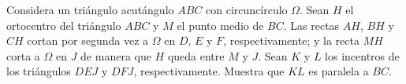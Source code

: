 Considera un triángulo acutángulo $ABC$ con circuncírculo $\Omega$. Sean $H$ el ortocentro del
triángulo $ABC$ y $M$ el punto medio de $BC$. Las rectas $AH$, $BH$ y $CH$ cortan por
segunda vez a $\Omega$ en $D$, $E$ y $F$, respectivamente; y la recta $MH$ corta a $\Omega$ en $J$ de manera
que $H$ queda entre $M$ y $J$. Sean $K$ y $L$ los incentros de los triángulos $DEJ$ y $DFJ$,
respectivamente. Muestra que $KL$ es paralela a $BC$.